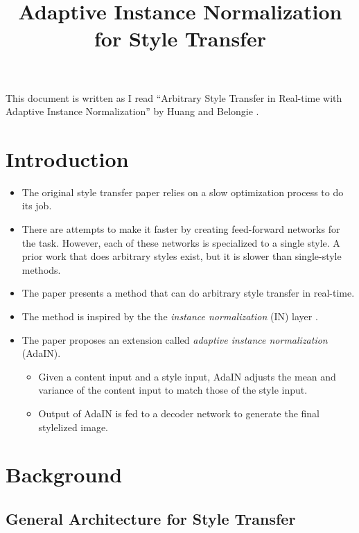 \documentclass[10pt]{article}
\title{Adaptive Instance Normalization for Style Transfer}
\begin{document}
  \maketitle

  This document is written as I read ``Arbitrary Style Transfer in Real-time with Adaptive Instance Normalization'' by Huang and Belongie \cite{Huang:2017}.

  \section{Introduction}

  \begin{itemize}
  	\item The original style transfer paper \cite{Gatys:2016} relies on a slow optimization process to do its job.

  	\item There are attempts to make it faster by creating feed-forward networks for the task. However, each of these networks is specialized to a single style. A prior work that does arbitrary styles exist, but it is slower than single-style methods.

  	\item The paper presents a method that can do arbitrary style transfer in real-time.

  	\item The method is inspired by the the \emph{instance normalization} (IN) layer \cite{Dumoulin:2016, Ulyanov:2017}.

  	\item The paper proposes an extension called \emph{adaptive instance normalization} (AdaIN).

  	\begin{itemize}
  		\item Given a content input and a style input, AdaIN adjusts the mean and variance of the content input to match those of the style input.

  		\item Output of AdaIN is fed to a decoder network to generate the final stylelized image.
  	\end{itemize}  	
  \end{itemize}

  \section{Background}

  \subsection{General Architecture for Style Transfer}
\end{document}
